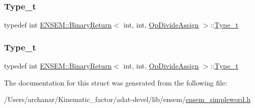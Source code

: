 \mbox{\label{structENSEM_1_1BinaryReturn_3_01int_00_01int_00_01OpDivideAssign_01_4_a1d70852aadd3281d90240a0c36417d8b}} 
\subsubsection{\texorpdfstring{Type\_t}{Type\_t}\hspace{0.1cm}{\footnotesize\ttfamily [2/3]}}
{\footnotesize\ttfamily typedef int \mbox{\hyperlink{structENSEM_1_1BinaryReturn}{E\+N\+S\+E\+M\+::\+Binary\+Return}}$<$ int, int, \mbox{\hyperlink{structENSEM_1_1OpDivideAssign}{Op\+Divide\+Assign}} $>$\+::\mbox{\hyperlink{structENSEM_1_1BinaryReturn_3_01int_00_01int_00_01OpDivideAssign_01_4_a1d70852aadd3281d90240a0c36417d8b}{Type\+\_\+t}}}

\mbox{\label{structENSEM_1_1BinaryReturn_3_01int_00_01int_00_01OpDivideAssign_01_4_a1d70852aadd3281d90240a0c36417d8b}} 
\subsubsection{\texorpdfstring{Type\_t}{Type\_t}\hspace{0.1cm}{\footnotesize\ttfamily [3/3]}}
{\footnotesize\ttfamily typedef int \mbox{\hyperlink{structENSEM_1_1BinaryReturn}{E\+N\+S\+E\+M\+::\+Binary\+Return}}$<$ int, int, \mbox{\hyperlink{structENSEM_1_1OpDivideAssign}{Op\+Divide\+Assign}} $>$\+::\mbox{\hyperlink{structENSEM_1_1BinaryReturn_3_01int_00_01int_00_01OpDivideAssign_01_4_a1d70852aadd3281d90240a0c36417d8b}{Type\+\_\+t}}}



The documentation for this struct was generated from the following file\+:\begin{DoxyCompactItemize}
\item 
/\+Users/archanar/\+Kinematic\+\_\+factor/adat-\/devel/lib/ensem/\mbox{\hyperlink{adat-devel_2lib_2ensem_2ensem__simpleword_8h}{ensem\+\_\+simpleword.\+h}}\end{DoxyCompactItemize}
